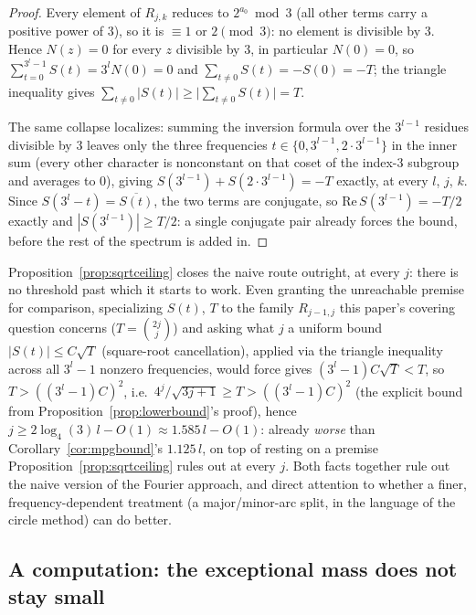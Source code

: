 \documentclass[11pt]{amsart}
\theoremstyle{plain}
\theoremstyle{definition}
\theoremstyle{remark}
\begin{document}
\begin{proof}
Every element of $R_{j,k}$ reduces to $2^{a_0}\bmod3$ (all other terms carry a positive power of
$3$), so it is $\equiv1$ or $2\pmod3$: no element is divisible by $3$. Hence $N(z)=0$ for every $z$
divisible by $3$, in particular $N(0)=0$, so $\sum_{t=0}^{3^l-1}S(t)=3^lN(0)=0$ and
$\sum_{t\ne0}S(t)=-S(0)=-T$; the triangle inequality gives $\sum_{t\ne0}|S(t)|\ge\bigl|\sum_{t\ne0}
S(t)\bigr|=T$.

The same collapse localizes: summing the inversion formula over the $3^{l-1}$ residues divisible by
$3$ leaves only the three frequencies $t\in\{0,3^{l-1},2\cdot3^{l-1}\}$ in the inner sum (every other
character is nonconstant on that coset of the index-$3$ subgroup and averages to $0$), giving
$S(3^{l-1})+S(2\cdot3^{l-1})=-T$ exactly, at every $l$, $j$, $k$. Since $S(3^l-t)=\overline{S(t)}$,
the two terms are conjugate, so $\mathrm{Re}\,S(3^{l-1})=-T/2$ exactly and $|S(3^{l-1})|\ge T/2$: a
single conjugate pair already forces the bound, before the rest of the spectrum is added in.
\end{proof}

Proposition~\ref{prop:sqrtceiling} closes the naive route outright, at every $j$: there is no
threshold past which it starts to work. Even granting the unreachable premise for
comparison, specializing $S(t)$, $T$ to the family $R_{j-1,j}$ this paper's covering question
concerns ($T=\binom{2j}{j}$) and asking what $j$ a uniform bound $|S(t)|\le C\sqrt{T}$
(square-root cancellation), applied via the triangle inequality across all $3^l-1$ nonzero
frequencies, would force gives $(3^l-1)C\sqrt{T} < T$, so $T > ((3^l-1)C)^2$, i.e.\
$4^j/\sqrt{3j+1} \ge T > ((3^l-1)C)^2$ (the explicit bound from Proposition~\ref{prop:lowerbound}'s
proof), hence $j \ge 2\log_4(3)\,l - O(1) \approx 1.585\,l - O(1)$: already \emph{worse} than
Corollary~\ref{cor:mpgbound}'s $1.125\,l$, on top of resting on a premise
Proposition~\ref{prop:sqrtceiling} rules out at every $j$. Both facts together rule out the naive
version of the Fourier approach, and direct attention to whether a finer, frequency-dependent
treatment (a major/minor-arc split, in the language of the circle method) can do better.

\subsection{A computation: the exceptional mass does not stay small}
\end{document}
